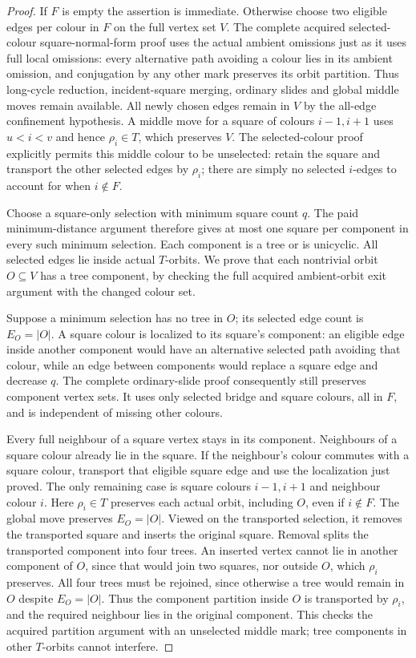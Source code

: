 \documentclass[11pt,a4paper]{article}
\begin{document}
\begin{proof}
If $F$ is empty the assertion is immediate. Otherwise choose two
eligible edges per colour in $F$ on the full vertex set $V$.
The complete acquired selected-colour square-normal-form proof
uses the actual ambient omissions just as it uses full local
omissions: every alternative path avoiding a colour lies in its
ambient omission, and conjugation by any other mark preserves its
orbit partition. Thus long-cycle reduction, incident-square merging,
ordinary slides and global middle moves remain available.
All newly chosen edges remain in $V$ by the all-edge confinement
hypothesis. A middle move for a square of colours $i-1,i+1$
uses $u<i<v$ and hence $\rho_i\in T$, which preserves $V$.
The selected-colour proof explicitly permits this middle colour to
be unselected: retain the square and transport the other selected
edges by $\rho_i$; there are simply no selected $i$-edges to
account for when $i\notin F$.

Choose a square-only selection with minimum square count $q$.
The paid minimum-distance argument therefore gives at most one
square per component in every such minimum selection. Each
component is a tree or is unicyclic. All selected edges lie inside
actual $T$-orbits. We prove that each nontrivial orbit $O\subseteq V$
has a tree component, by checking the full acquired ambient-orbit
exit argument with the changed colour set.

Suppose a minimum selection has no tree in $O$; its selected edge
count is $E_O=|O|$. A square colour is localized to its square's
component: an eligible edge inside another component would have
an alternative selected path avoiding that colour, while an edge
between components would replace a square edge and decrease $q$.
The complete ordinary-slide proof consequently still preserves
component vertex sets. It uses only selected bridge and square
colours, all in $F$, and is independent of missing other colours.

Every full neighbour of a square vertex stays in its component.
Neighbours of a square colour already lie in the square.
If the neighbour's colour commutes with a square colour, transport
that eligible square edge and use the localization just proved.
The only remaining case is square colours $i-1,i+1$ and neighbour
colour $i$. Here $\rho_i\in T$ preserves each actual orbit,
including $O$, even if $i\notin F$. The global move preserves
$E_O=|O|$. Viewed on the transported selection, it removes the
transported square and inserts the original square. Removal splits
the transported component into four trees. An inserted vertex
cannot lie in another component of $O$, since that would join two
squares, nor outside $O$, which $\rho_i$ preserves. All four trees
must be rejoined, since otherwise a tree would remain in $O$ despite
$E_O=|O|$. Thus the component partition inside $O$ is transported
by $\rho_i$, and the required neighbour lies in the original
component. This checks the acquired partition argument with an
unselected middle mark; tree components in other $T$-orbits cannot
interfere.


\end{proof}
\end{document}
